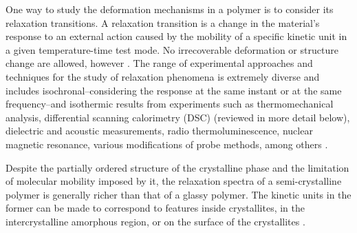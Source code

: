 One way to study the deformation mechanisms in a polymer is to consider its relaxation transitions.
A relaxation transition is a change in the material's response to an external action caused by the mobility of a specific kinetic unit in a given temperature-time test mode.
No irrecoverable deformation or structure change are allowed, however \citep{arzhakovRelaxationPhysicalMechanical2019}.
The range of experimental approaches and techniques for the study of relaxation phenomena is extremely diverse and includes isochronal--considering the response at the same instant or at the same frequency--and isothermic results from experiments such as thermomechanical analysis, differential scanning calorimetry (DSC)  (reviewed in more detail below), dielectric and acoustic measurements, radio thermoluminescence, nuclear magnetic resonance, various modifications of probe methods, among others \citep{ferryViscoelasticPropertiesPolymers1980, arzhakovRelaxationPhysicalMechanical2019}.

Despite the partially ordered structure of the crystalline phase and the limitation of molecular mobility imposed by it, the relaxation spectra of a semi-crystalline polymer is generally richer than that of a glassy polymer.
The kinetic units in the former can be made to correspond to features inside crystallites, in the intercrystalline amorphous region, or on the surface of the crystallites \citep{ferryViscoelasticPropertiesPolymers1980, arzhakovRelaxationPhysicalMechanical2019}.

